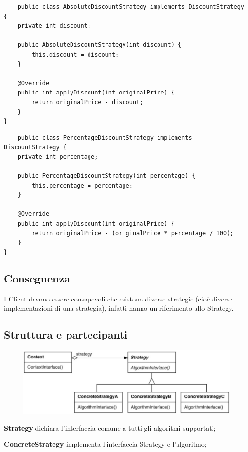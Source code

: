 \begin{multicols}{2}
\begin{lstlisting}
    public class AbsoluteDiscountStrategy implements DiscountStrategy {
    private int discount;
    
    public AbsoluteDiscountStrategy(int discount) {
        this.discount = discount;
    }

    @Override
    public int applyDiscount(int originalPrice) {
        return originalPrice - discount;
    }
}    
\end{lstlisting}
\columnbreak
\begin{lstlisting}
    public class PercentageDiscountStrategy implements DiscountStrategy {
    private int percentage;
    
    public PercentageDiscountStrategy(int percentage) {
        this.percentage = percentage;
    }

    @Override
    public int applyDiscount(int originalPrice) {
        return originalPrice - (originalPrice * percentage / 100);
    }
}
\end{lstlisting}
\end{multicols}

\subsection{Conseguenza}

I Client devono essere consapevoli che esistono diverse strategie (cioè diverse implementazioni di una strategia), infatti hanno un riferimento allo Strategy.

\subsection{Struttura e partecipanti}

\begin{figure}[H]
    \centering   
    \includegraphics[width=0.5\linewidth]{../../immagini/templateMethod_Strategy/struttura_strategy}    
\end{figure}

\textbf{Strategy} dichiara l’interfaccia comune a tutti gli algoritmi supportati;

\textbf{ConcreteStrategy} implementa l’interfaccia Strategy e l’algoritmo;

